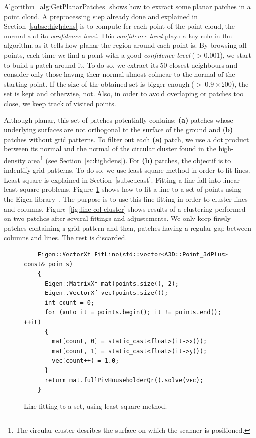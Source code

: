 Algorithm~\ref{alg:GetPlanarPatches} shows how to extract some planar patches in a point cloud. A preprocessing step already done and explained in Section~\ref{subsc:highdens} is to compute for each point of the point cloud, the normal and its \emph{confidence level}. This \emph{confidence level} plays a key role in the algorithm as it tells how planar the region around each point is. By browsing all points, each time we find a point with a good \emph{confidence level} ($> 0.001$), we start to build a patch around it. To do so, we extract its 50
closest neighbours and consider only those having their normal almost colinear to the normal of the starting point. If the size of the obtained set is bigger enough ($>\ 0.9 \times 200$), the set is kept and otherwise, not. Also, in order to avoid overlaping or patches too close, we keep track of visited points.

Although planar, this set of patches potentially contains: \textbf{(a)} patches whose underlying surfaces are not orthogonal to the surface of the ground and \textbf{(b)} patches without grid patterns. To filter out each \textbf{(a)} patch, we use a dot product between its normal and the normal of the circular cluster found in the high-density area\footnote{The circular cluster desribes the surface on which the scanner is positioned.} (see Section~\ref{sc:highdens}). For \textbf{(b)} patches,
the objectif is to indentify grid-patterns. To do so, we use least square method in order to fit lines. Least-square is explained in Section~\ref{subsc:least}. Fitting a line fall into linear least square problems. Figure~\ref{fig:fitline} shows how to fit a line to a set of points using the Eigen library~\cite{eigenweb}. The purpose is to use this line fitting in order to cluster lines and columns. Figure~\ref{fig:line-col-cluster} shows results of a clustering performed on two patches after several fittings and adjustements. We only keep firstly patches containing a grid-pattern and then, patches having a regular gap between columns and lines. The rest is discarded.

\begin{figure}
  \centering
  \begin{lstlisting}
    Eigen::VectorXf FitLine(std::vector<A3D::Point_3dPlus> const& points)
    {
      Eigen::MatrixXf mat(points.size(), 2);
      Eigen::VectorXf vec(points.size());
      int count = 0;
      for (auto it = points.begin(); it != points.end(); ++it)
      {
        mat(count, 0) = static_cast<float>(it->x());
        mat(count, 1) = static_cast<float>(it->y());
        vec(count++) = 1.0;
      }
      return mat.fullPivHouseholderQr().solve(vec);
    }
  \end{lstlisting}
  \caption{Line fitting to a set, using least-square method.}
  \label{fig:fitline}
\end{figure}

